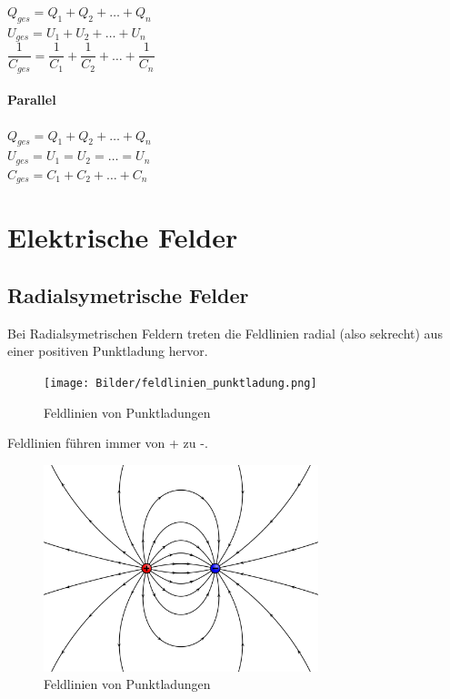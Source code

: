 \documentclass[a4paper]{article}
\begin{document}
\begin{center}
	\Large
		$Q_{ges} = Q_1 + Q_2 + … + Q_n$\\[0,5cm]
		$U_{ges} = U_1 + U_2 + … + U_n$\\[0,5cm]
		$\dfrac{1}{C_{ges}} = \dfrac{1}{C_1} + \dfrac{1}{C_2} + … + \dfrac{1}{C_n}$\\[1cm]
	\normalsize
\end{center}


\paragraph{Parallel}

\begin{center}
	\Large
		$Q_{ges} = Q_1 + Q_2 + … + Q_n$\\[0,5cm]
		$U_{ges} = U_1 = U_2 = … = U_n$\\[0,5cm]
		$C_{ges} = C_1 + C_2 + … + C_n$\\[1cm]
	\normalsize
\end{center}


\section{Elektrische Felder}

\subsection{Radialsymetrische Felder}
Bei Radialsymetrischen Feldern treten die Feldlinien radial (also sekrecht)
aus einer positiven Punktladung hervor.

\begin{figure} [h]
	\begin{center}
		\texttt{[image: Bilder/feldlinien\_punktladung.png]}
		\caption{Feldlinien von Punktladungen}
	\end{center}
\end{figure}

Feldlinien führen immer von + zu -.

\begin{figure} [h]
	\begin{center}
		\includegraphics[width=8cm]{Bilder/field.png}
		\caption{Feldlinien von Punktladungen}
	\end{center}
\end{figure}
\end{document}
